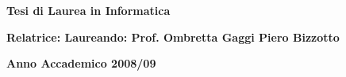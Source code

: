 \begin{titlepage}
\begin{center}
	\textbf{Tesi di Laurea in Informatica}
\end{center}

\vspace{30pt}

\begin{center}
\textbf{Relatrice:   \hspace{230pt}  Laureando:   \linebreak 
Prof. Ombretta Gaggi \hspace{144pt} Piero Bizzotto}
\end{center}

\vspace{30pt}

\begin{center}
\textbf{Anno Accademico 2008/09}
\end{center}

\end{titlepage}
\newpage

\clearpage
\null
\thispagestyle{empty}
\clearpage
\frontmatter


\tableofcontents



